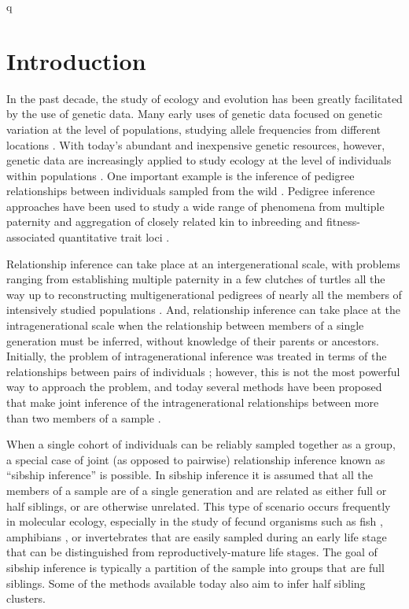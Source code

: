 q%

\section*{Introduction}

In the past decade, the study of ecology and evolution has been greatly facilitated by the use of genetic 
data.  Many early uses of genetic data focused on genetic variation at the level of populations, 
studying allele frequencies from different locations \citep{neigel97}. With today's abundant and 
inexpensive genetic resources, however, genetic data are increasingly applied to study ecology at the 
level of individuals within populations \citep{Pea&Cra2004,Maneletal2005}. One important example is the 
inference of pedigree relationships between individuals sampled from the wild 
\citep{blouin03,Pemberton2008}. Pedigree inference approaches have been used to study a wide range of 
phenomena from multiple paternity \citep{Sogardetal2005} and aggregation of closely related kin 
\citep{Fraseretal2005}  to inbreeding \citep{Marshalletal2002} and fitness-associated quantitative 
trait loci \citep{beraldi07}. 

Relationship inference can take place at an intergenerational scale, with problems ranging from 
establishing multiple paternity in a few clutches of turtles \citep{Pea&Avi2001} all the way up to 
reconstructing multigenerational pedigrees of nearly all the members of intensively studied populations 
\citep{Robinsonetal2006,Dunnetal2011}.  And, relationship inference can take place at the intragenerational scale when the relationship between members of a single generation must be inferred, 
without knowledge of their parents or ancestors.  Initially, the problem of intragenerational inference 
was treated in terms of the relationships between pairs of individuals \citep{Thompson1975}; 
however, this is not the most powerful way to approach the problem, and today several methods have been 
proposed that make joint inference of the intragenerational relationships between more than two members 
of a sample \citep{painter97,almudevar99,Siebertsetal02,Wang2007_triadic}.  

When a single cohort of individuals can be reliably sampled together as a group, a special case of 
joint (as opposed to pairwise) relationship inference known as ``sibship inference'' is possible.  In 
sibship inference it is assumed that all the members of a sample are of a single generation and are 
related as either full or half siblings, or are otherwise unrelated. This type of scenario occurs 
frequently in molecular ecology, especially in the study of fecund organisms such as fish 
\citep{And&Dun2008,Garzaetal_norcal}, amphibians \citep{Halversonetal2006}, or invertebrates \citep{read12} that are 
easily sampled during an early life stage that can be distinguished from reproductively-mature life 
stages.  The goal of sibship inference is typically a partition of the sample into groups that are full 
siblings. Some of the methods available today also aim to infer half sibling clusters.  

